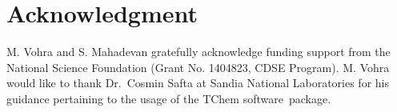 \section*{Acknowledgment}

M. Vohra and S. Mahadevan gratefully acknowledge funding support from the
National Science Foundation (Grant No. 1404823, CDSE Program).
M. Vohra would like to thank Dr.~Cosmin Safta at Sandia National
Laboratories for his guidance pertaining to the usage of the TChem software\
package.

